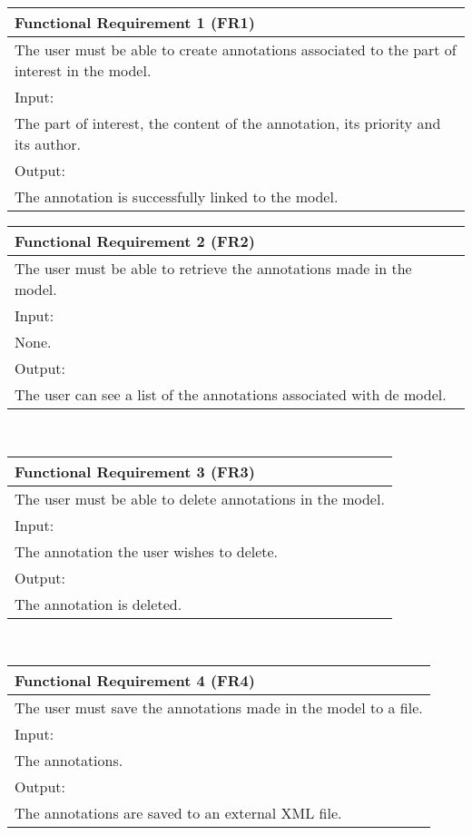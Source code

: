 \begin{center}

\begin{tabular}{p{12.6cm}}
	\hline
	{\Large Functional Requirement 1 (FR1)}\\ \hline \hline
	The user must be able to create annotations associated to the part of interest in the model. \\ \hline
	\large{Input:}\\ \hline
	The part of interest, the content of the annotation, its priority and its author.\\ \hline \hline
	\large{Output:}\\ \hline
	The annotation is successfully linked to the model.\\ \hline
\end{tabular}
\vspace{10mm}

\begin{tabular}{p{12.6cm}}
	\hline
	{\Large Functional Requirement 2 (FR2)}\\ \hline \hline
	The user must be able to retrieve the annotations made in the model. \\ \hline
	\large{Input:}\\ \hline
	None.\\ \hline \hline
	\large{Output:}\\ \hline
	The user can see a list of the annotations associated with de model.\\
	\hline
\end{tabular}\\
\vspace{10mm}

\begin{tabular}{p{12.6cm}}
	\hline
	{\Large Functional Requirement 3 (FR3)}\\ \hline \hline
	The user must be able to delete annotations in the model. \\ \hline
	\large{Input:}\\ \hline
	The annotation the user wishes to delete.\\ \hline \hline
	\large{Output:}\\ \hline
	The annotation is deleted.\\
	\hline
\end{tabular}\\
\vspace{10mm}



\begin{tabular}{p{12.6cm}}
	\hline
	{\Large Functional Requirement 4 (FR4)}\\ \hline \hline
	The user must save the annotations made in the model to a file. \\ \hline
	\large{Input:}\\ \hline
	The annotations.\\ \hline \hline
	\large{Output:}\\ \hline
	The annotations are saved to an external XML file.\\
	\hline
\end{tabular}\\
\vspace{10mm}


\end{center}
